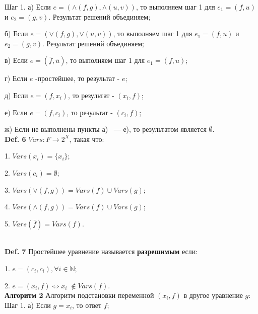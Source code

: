 \documentclass[12pt]{article}
\begin{document}
     Шаг 1. а) Если $e=(\wedge(f,g),\wedge(u,v))$, то выполняем шаг 1 для $e_{1}=(f,u)$ и $e_{2}=(g,v)$. Результат решений объединяем;
     
     б) Если $e=(\vee(f,g),\vee(u,v))$, то выполняем шаг 1 для $e_{1}=(f,u)$ и $e_{2}=(g,v)$. Результат решений объединяем;
     
     в) Если $e=(\bar f,\bar u)$, то выполняем шаг 1 для $e_{1}=(f,u)$;
     
     г) Если $e$ -простейшее, то результат - $e$;
     
     д) Если $e=(f,x_{i})$, то результат - $(x_{i}, f)$; 
     
     е) Если $e=(f,c_{i})$, то результат - $(c_{i}, f)$; 
     
     ж) Если не выполнены пункты а) ~--- \; е), то результатом является $  \emptyset $.
     \\  
        
     {\bf Def. 6} $Vars:F \rightarrow 2^{X}$, такая что:
     
     1. $Vars(x_{i})= \lbrace x_{i} \rbrace$;
     
     2. $Vars(c_{i})=  \emptyset$;
     
     3. $Vars(\vee(f,g))= Vars(f)\cup Vars(g)$;
     
     4. $Vars(\wedge(f,g))= Vars(f)\cup Vars(g)$;
     
     5. $Vars(\bar f)= Vars(f)$.
     \\
\begin{comment}    
    {\bf Def. 7} $Len: F \longrightarrow \mathbb{N}$ такая что:
    
    1. $Len(x_{i})= 1$;
    
    2. $Len(c_{i})=  1$;
    
    3. $Len(\vee(f,g))= Len(f) + Len(g)$;
    
    4. $Len(\wedge(f,g))= Len(f) + Len(g)$;
    
    5. $Len(\bar f)= Len(f)$.  
\end{comment}   
    \\
     
     {\bf Def. 7} Простейшее уравнение называется {\bf разрешимым} если:
     
     1. $e =(c_{i},c_{i}), \forall i \in \mathbb{N}$;
     
     2. $e =(x_{i},f) \Leftrightarrow x_{i} \;\notin Vars(f)$.
     \\
     
    \hypertarget{a2}{{\bf Алгоритм 2}} Алгоритм подстановки переменной $ (x_{i},f) $ в другое уравнение $g$: 
    \\
    Шаг 1. а) Если $g = x_{i}$, то ответ  $f$;
    
\end{document}
